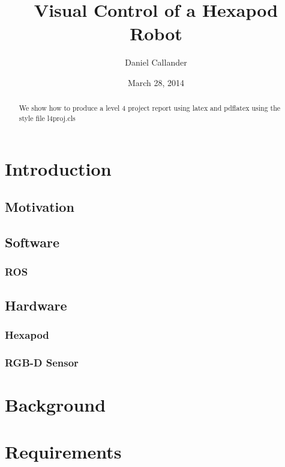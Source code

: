 \documentclass{l4proj}
\begin{document}
\title{Visual Control of a Hexapod Robot}
\author{Daniel Callander}
\date{March 28, 2014}
\maketitle

\begin{abstract}
We show how to produce a level 4 project report using latex and pdflatex using the 
style file l4proj.cls
\end{abstract}

\educationalconsent
%
%
\tableofcontents

\chapter{Introduction}

\section{Motivation}
\section{Software}
\subsection{ROS}

\section{Hardware}
\subsection{Hexapod}
\subsection{RGB-D Sensor}

\chapter{Background}

\chapter{Requirements}
\end{document}

